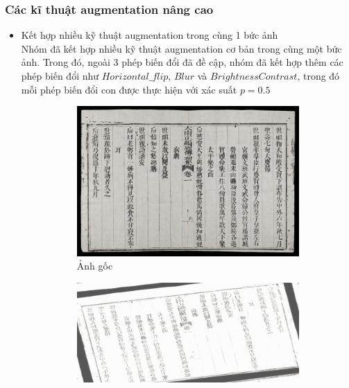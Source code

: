 \documentclass[a4paper,12pt]{article}
\begin{document}
\subsubsection{Các kĩ thuật augmentation nâng cao}

\begin{itemize}
    \item Kết hợp nhiều kỹ thuật augmentation trong cùng 1 bức ảnh
    \\Nhóm đã kết hợp nhiều kỹ thuật augmentation cơ bản trong cùng một bức ảnh. Trong đó, ngoài $3$ phép biến đổi đã đề cập, nhóm đã kết hợp thêm các phép biến đổi như $Horizontal\_flip$, $Blur$ và $BrightnessContrast$, trong đó mỗi phép biến đổi con được thực hiện với xác suất $p=0.5$
    \begin{figure}[H]
        \centering
        \begin{subfigure}{.4\textwidth}
          \includegraphics[width=1\linewidth]{images/original_img_2.jpg}
          \caption{Ảnh gốc}
        \end{subfigure}
        \hspace{20mm}
        \begin{subfigure}{.4\textwidth}
          \includegraphics[width=1\linewidth]{images/combined_img.png}

\end{subfigure}
\end{figure}
\end{itemize}
\end{document}
